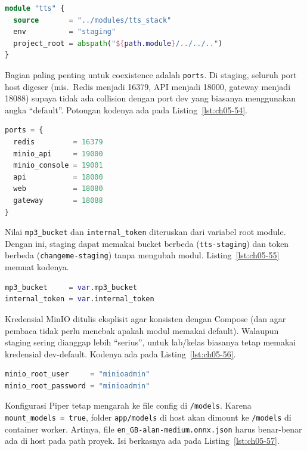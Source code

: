 \begin{lstlisting}[language=terraform, caption={Potongan awal staging/main.tf}, label={lst:ch05-53}]
module "tts" {
  source       = "../modules/tts_stack"
  env          = "staging"
  project_root = abspath("${path.module}/../../..")
}
\end{lstlisting}

Bagian paling penting untuk coexistence adalah \texttt{ports}. Di staging, seluruh port host digeser (mis.\ Redis menjadi 16379, API menjadi 18000, gateway menjadi 18088) supaya tidak ada collision dengan port dev yang biasanya menggunakan angka ``default''. Potongan kodenya ada pada Listing~\ref{lst:ch05-54}.

\begin{lstlisting}[language=terraform, caption={Potongan kode Terraform pada main.tf (11)}, label={lst:ch05-54}]
ports = {
  redis         = 16379
  minio_api     = 19000
  minio_console = 19001
  api           = 18000
  web           = 18080
  gateway       = 18088
}
\end{lstlisting}

Nilai \texttt{mp3\_bucket} dan \texttt{internal\_token} diteruskan dari variabel root module. Dengan ini, staging dapat memakai bucket berbeda (\texttt{tts-staging}) dan token berbeda (\texttt{changeme-staging}) tanpa mengubah modul. Listing~\ref{lst:ch05-55} memuat kodenya.

\begin{lstlisting}[language=terraform, caption={Potongan kode Terraform pada main.tf (12)}, label={lst:ch05-55}]
mp3_bucket     = var.mp3_bucket
internal_token = var.internal_token
\end{lstlisting}

Kredensial MinIO ditulis eksplisit agar konsisten dengan Compose (dan agar pembaca tidak perlu menebak apakah modul memakai default). Walaupun staging sering dianggap lebih ``serius'', untuk lab/kelas biasanya tetap memakai kredensial dev-default. Kodenya ada pada Listing~\ref{lst:ch05-56}.

\begin{lstlisting}[language=terraform, caption={Potongan kode Terraform pada main.tf (13)}, label={lst:ch05-56}]
minio_root_user     = "minioadmin"
minio_root_password = "minioadmin"
\end{lstlisting}

Konfigurasi Piper tetap mengarah ke file config di \texttt{/models}. Karena \texttt{mount\_models = true}, folder \texttt{app/models} di host akan dimount ke \texttt{/models} di container worker. Artinya, file \texttt{en\_GB-alan-medium.onnx.json} harus benar-benar ada di host pada path proyek. Isi berkasnya ada pada Listing~\ref{lst:ch05-57}.

